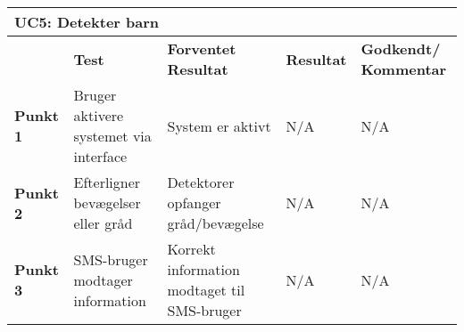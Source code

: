 \begin{table}[htbp] \centering
\begin{tabular}{|p{}|p{}|p{3cm}|p{3cm}|p{3cm}|} %
	\hline
\multicolumn{5}{|l|}{\textbf{UC5: Detekter barn}} \\\hline
&\textbf{Test} &\textbf{Forventet \newline Resultat} &\textbf{Resultat} &\textbf{Godkendt/ \newline Kommentar} \\\hline
\textbf{Punkt 1}		&Bruger aktivere systemet via interface	&System er aktivt 	&N/A 	&N/A \\\hline
\textbf{Punkt 2}		&Efterligner bevægelser eller gråd	&Detektorer opfanger gråd/bevægelse 	&N/A 	&N/A \\\hline
\textbf{Punkt 3}		&SMS-bruger modtager information	&Korrekt information modtaget til SMS-bruger 	&N/A 	&N/A  \\\hline
	\end{tabular}
	\label{ATUC5} 
\end{table}